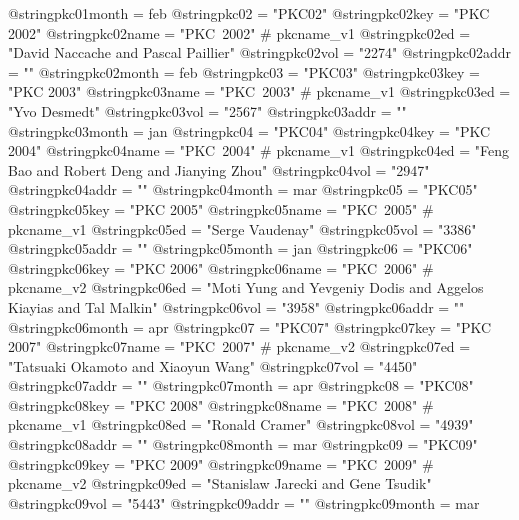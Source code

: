 @string{pkc01month =            feb}
@string{pkc02 =                 "PKC02"}
@string{pkc02key =              "PKC 2002"}
@string{pkc02name =             "PKC~2002" # pkcname_v1}
@string{pkc02ed =               "David Naccache and Pascal Paillier"}
@string{pkc02vol =              "2274"}
@string{pkc02addr =             ""}
@string{pkc02month =            feb}
@string{pkc03 =                 "PKC03"}
@string{pkc03key =              "PKC 2003"}
@string{pkc03name =             "PKC~2003" # pkcname_v1}
@string{pkc03ed =               "Yvo Desmedt"}
@string{pkc03vol =              "2567"}
@string{pkc03addr =             ""}
@string{pkc03month =            jan}
@string{pkc04 =                 "PKC04"}
@string{pkc04key =              "PKC 2004"}
@string{pkc04name =             "PKC~2004" # pkcname_v1}
@string{pkc04ed =               "Feng Bao and Robert Deng and Jianying Zhou"}
@string{pkc04vol =              "2947"}
@string{pkc04addr =             ""}
@string{pkc04month =            mar}
@string{pkc05 =                 "PKC05"}
@string{pkc05key =              "PKC 2005"}
@string{pkc05name =             "PKC~2005" # pkcname_v1}
@string{pkc05ed =               "Serge Vaudenay"}
@string{pkc05vol =              "3386"}
@string{pkc05addr =             ""}
@string{pkc05month =            jan}
@string{pkc06 =                 "PKC06"}
@string{pkc06key =              "PKC 2006"}
@string{pkc06name =             "PKC~2006" # pkcname_v2}
@string{pkc06ed =               "Moti Yung and Yevgeniy Dodis and Aggelos Kiayias and Tal Malkin"}
@string{pkc06vol =              "3958"}
@string{pkc06addr =             ""}
@string{pkc06month =            apr}
@string{pkc07 =                 "PKC07"}
@string{pkc07key =              "PKC 2007"}
@string{pkc07name =             "PKC~2007" # pkcname_v2}
@string{pkc07ed =               "Tatsuaki Okamoto and Xiaoyun Wang"}
@string{pkc07vol =              "4450"}
@string{pkc07addr =             ""}
@string{pkc07month =            apr}
@string{pkc08 =                 "PKC08"}
@string{pkc08key =              "PKC 2008"}
@string{pkc08name =             "PKC~2008" # pkcname_v1}
@string{pkc08ed =               "Ronald Cramer"}
@string{pkc08vol =              "4939"}
@string{pkc08addr =             ""}
@string{pkc08month =            mar}
@string{pkc09 =                 "PKC09"}
@string{pkc09key =              "PKC 2009"}
@string{pkc09name =             "PKC~2009" # pkcname_v2}
@string{pkc09ed =               "Stanislaw Jarecki and Gene Tsudik"}
@string{pkc09vol =              "5443"}
@string{pkc09addr =             ""}
@string{pkc09month =            mar}
